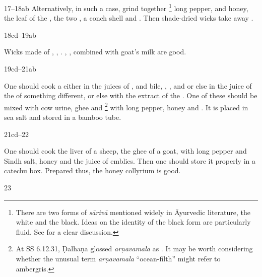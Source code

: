 \begin{translation}
    \item [17--18ab] Alternatively, in such a case, grind together
    \footnote{There are two forms of
    \emph{sārivā} mentioned widely in Āyurvedic literature, the white and the black.
    Ideas on the identity of the black form are particularly fluid.  See
    \citet[434--438]{adps} for a clear discussion.} long pepper,  and honey, the leaf of the , the two
    , a conch shell and . %
    Then shade-dried wicks take away .
    
    
    \item[18cd--19ab]
    
    Wicks made of ,
    ,
    .
    , 
    , 
    combined with goat's milk are good.
    
    \item[19cd--21ab]
    
    One should cook a  either in the juices of
    , and bile, , , and
     or else in the juice of the  of something
    different, or else with the extract of the . %
    One of these should be mixed with cow urine, ghee and \footnote{At SS 6.12.31, Ḍalhaṇa glossed \emph{arṇavamala} as
    . It may be worth considering whether the
    unusual term \emph{arṇavamala} “ocean-filth” might refer to ambergris.} with long
    pepper, honey and . It is placed in sea salt and stored
    in a bamboo tube.
    
    \item[21cd--22]
    
    One should cook the liver of a sheep, the ghee of a goat, with long pepper and Sindh 
    salt, honey and the juice of emblics.  Then one should store it properly in a catechu 
    box.  Prepared thus, the honey collyrium is good. 
    
    
    \item[23]
    

\end{translation}
